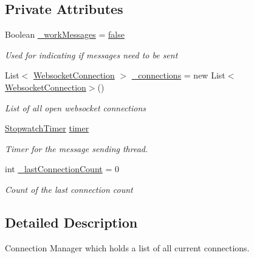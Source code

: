\subsection*{Private Attributes}
\begin{DoxyCompactItemize}
\item 
Boolean \hyperlink{class_web_analyzer_1_1_server_1_1_connection_manager_a23a1f3a046b14bcb1333c3ef846015d6}{\+\_\+work\+Messages} = \hyperlink{_u_i_2_h_t_m_l_resources_2js_2src_2export_8js_ae6c865df784842196d411c1466b01686}{false}
\begin{DoxyCompactList}\small\item\em Used for indicating if messages need to be sent \end{DoxyCompactList}\item 
List$<$ \hyperlink{class_web_analyzer_1_1_server_1_1_websocket_connection}{Websocket\+Connection} $>$ \hyperlink{class_web_analyzer_1_1_server_1_1_connection_manager_a4d1d80f0e1bca824c36908efcc4f9dc0}{\+\_\+connections} = new List$<$\hyperlink{class_web_analyzer_1_1_server_1_1_websocket_connection}{Websocket\+Connection}$>$()
\begin{DoxyCompactList}\small\item\em List of all open websocket connections \end{DoxyCompactList}\item 
\hyperlink{class_web_analyzer_1_1_util_1_1_stopwatch_timer}{Stopwatch\+Timer} \hyperlink{class_web_analyzer_1_1_server_1_1_connection_manager_aa639f32d7193a808bd9680359b325887}{timer}
\begin{DoxyCompactList}\small\item\em Timer for the message sending thread. \end{DoxyCompactList}\item 
int \hyperlink{class_web_analyzer_1_1_server_1_1_connection_manager_a26374e3936745ea45ecf5f77e4d8884f}{\+\_\+last\+Connection\+Count} = 0
\begin{DoxyCompactList}\small\item\em Count of the last connection count \end{DoxyCompactList}\end{DoxyCompactItemize}


\subsection{Detailed Description}
Connection Manager which holds a list of all current connections. 

